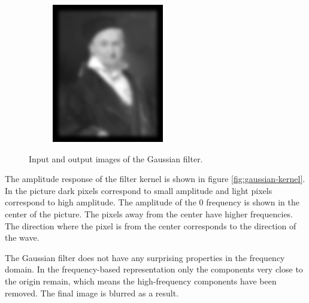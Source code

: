 \documentclass[]{article}
\begin{document}
\begin{figure}
\begin{subfigure}[t]{0.49\textwidth}
      \includegraphics[width=0.99\linewidth]{output.png}
    \end{subfigure}
    \caption{Input and output images of the Gaussian filter.}
    \label{fig:gaussian-input-output}
\end{figure}

The amplitude response of the filter kernel is shown in figure
\ref{fig:gaussian-kernel}. In the picture dark pixels correspond to small
amplitude and light pixels correspond to high amplitude. The amplitude of the 0
frequency is shown in the center of the picture. The pixels away from the center
have higher frequencies. The direction where the pixel is from the center
corresponds to the direction of the wave.

The Gaussian filter does not have any surprising properties in the frequency
domain. In the frequency-based representation only the components very close to
the origin remain, which means the high-frequency components have been removed.
The final image is blurred as a result.
\end{document}
